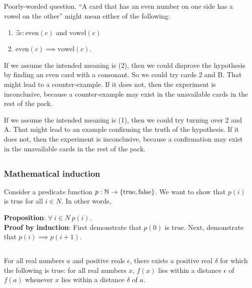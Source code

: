 \documentclass[12pt]{article}
\begin{document}
\subsection{}
\begin{mdframed}
Poorly-worded question. ``A card that has an even number on one side has a
vowel on the other'' might mean either of the following:
\begin{enumerate}
\item $\exists c: \text{even}(c) \text{~and~} \text{vowel}(c)$
\item $\text{even}(c) \implies \text{vowel}(c)$.
\end{enumerate}
If we assume the intended meaning is (2), then we could disprove the hypothesis
by finding an even card with a consonant. So we could try cards 2 and B. That
might lead to a counter-example. If it does not, then the experiment is
inconclusive, because a counter-example may exist in the unavailable cards in
the rest of the pack.

If we assume the intended meaning is (1), then we could try turning over 2 and
A. That might lead to an example confirming the truth of the hypothesis. If it
does not, then the experiment is inconclusive, because a confirmation may exist
in the unavailable cards in the rest of the pack.
\end{mdframed}
\subsection{}
\begin{mdframed}
\subsubsection*{Mathematical induction}
Consider a predicate function $p: \mathbb{N} \to \{\text{true},\text{false}\}$. We want to show
that $p(i)$ is true for all $i \in N$. In other words,

\textbf{Proposition}: $\forall ~ i \in N ~ p(i)$.\\

\textbf{Proof by induction}: First demonstrate that $p(0)$ is true. Next,
demonstrate that $p(i) \implies p(i+1)$.

\end{mdframed}

\subsection{}
\begin{mdframed}
  For all real numbers $a$ and positive reals $\epsilon$, there exists a
  positive real $\delta$ for which the following is true: for all real numbers
  $x$, $f(x)$ lies within a distance $\epsilon$ of $f(a)$ whenever $x$ lies
  within a distance $\delta$ of $a$.
\end{mdframed}
\end{document}
